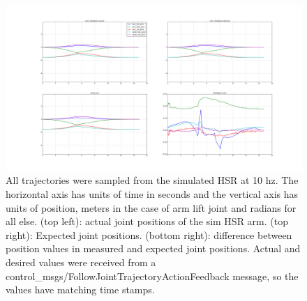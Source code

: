 \documentclass[12pt]{article}
\begin{document}
        \begin{figure}
            \includegraphics[width=\linewidth]{2020.04.02/positions.png}
            \centering
            \caption{All trajectories were sampled from the simulated HSR at 10 hz. The horizontal axis has units of time in seconds and the vertical axis has units of position, meters in the case of arm lift joint and radians for all else. (top left): actual joint positions of the sim HSR arm. (top right): Expected joint positions. (bottom right): difference between position values in measured and expected joint positions. Actual and desired values were received from a control\_msgs/FollowJointTrajectoryActionFeedback message, so the values have matching time stamps.}
            \label{fig:posAccuracy}
        \end{figure}
\end{document}
